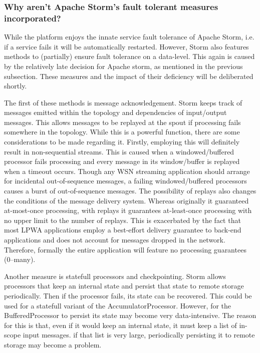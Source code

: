 \subsubsection{Why aren't Apache Storm's fault tolerant measures incorporated?}
While the platform enjoys the innate service fault tolerance of Apache Storm, i.e. if a service fails it will be automatically restarted. However, Storm also features methods to (partially) ensure fault tolerance on a data-level. This again is caused by the relatively late decision for Apache storm, as mentioned in the previous subsection. These measures and the impact of their deficiency will be deliberated shortly.

The first of these methods is message acknowledgement. Storm keeps track of messages emitted within the topology and dependencies of input/output messages. This allows messages to be replayed at the spout if processing fails somewhere in the topology. While this is a powerful function, there are some considerations to be made regarding it. Firstly, employing this will definitely result in non-sequential streams. This is caused when a windowed/buffered processor fails processing and every message in its window/buffer is replayed when a timeout occurs. Though any WSN streaming application should arrange for incidental out-of-sequence messages, a failing windowed/buffered processors causes a burst of out-of-sequence messages. The possibility of replays also changes the conditions of the message delivery system. Whereas originally it guaranteed at-most-once processing, with replays it guarantees at-least-once processing with no upper limit to the number of replays. This is exacerbated by the fact that most LPWA applications employ a best-effort delivery guarantee to back-end applications and does not account for messages dropped in the network. Therefore, formally the entire application will feature no processing guarantees (0--many).

Another measure is statefull processors and checkpointing. Storm allows processors that keep an internal state and persist that state to remote storage periodically. Then if the processor fails, its state can be recovered. This could be used for a statefull variant of the AccumulatorProcessor. However, for the BufferedProcessor to persist its state may become very data-intensive. The reason for this is that, even if it would keep an internal state, it must keep a list of in-scope input messages. if that list is very large, periodically persisting it to remote storage may become a problem.

